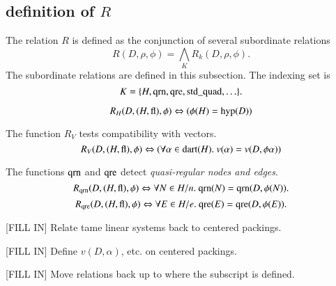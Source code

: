 \subsection{definition of $R$}

The relation $R$ is defined as the conjunction of several
subordinate relations
    $$R(D,\rho,\phi) = \bigwedge_K R_k (D,\rho,\phi).$$
The subordinate relations are defined in this subsection. The
indexing set is
    $$
    K = \{H,{\operatorname{qrn}},{\operatorname{qre}},{\operatorname{std\_quad}},\ldots\}.
    $$


\begin{definition}[$R_H$]
    $$R_H(D,(H,{{\operatorname{fl}}}),\phi) \Leftrightarrow (\phi(H)={\operatorname{hyp}}(D))$$
\end{definition}

\begin{definition}[$R_V$]
The function $R_{V}$ tests compatibility with vectors.
    $$R_V(D,(H,{{\operatorname{fl}}}),\phi) \Leftrightarrow
        (\forall \alpha\in {\operatorname{dart}}(H).\ v(\alpha) =
        v(D,\phi\alpha))$$
\end{definition}

\begin{definition}
 The functions ${\operatorname{qrn}}$ and ${\operatorname{qre}}$ detect {\it quasi-regular
 nodes and edges}.
        $$R_{{\operatorname{qrn}}}(D,(H,{\operatorname{fl}}),\phi) \Leftrightarrow
        \forall N\in H/n.\ {\operatorname{qrn}}(N) = {\operatorname{qrn}}(D,\phi(N)).
        $$
        $$R_{{\operatorname{qre}}}(D,(H,{\operatorname{fl}}),\phi) \Leftrightarrow
        \forall E\in H/e.\ {\operatorname{qre}}(E) = {\operatorname{qre}}(D,\phi(E)).
        $$
\end{definition}



[FILL IN]  Relate tame linear systems back to centered packings.

[FILL IN] Define $v(D,\alpha)$, etc. on centered packings.

[FILL IN] Move relations back up to where the subscript is
defined.


